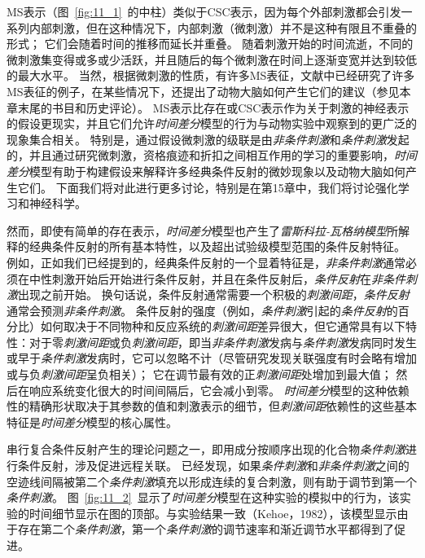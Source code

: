 {MS表示（图~\ref{fig:11_1}~的中柱）类似于CSC表示，因为每个外部刺激都会引发一系列内部刺激，但在这种情况下，内部刺激（微刺激）并不是这种有限且不重叠的形式；
它们会随着时间的推移而延长并重叠。
随着刺激开始的时间流逝，不同的微刺激集变得或多或少活跃，并且随后的每个微刺激在时间上逐渐变宽并达到较低的最大水平。
当然，根据微刺激的性质，有许多MS表征，文献中已经研究了许多MS表征的例子，在某些情况下，还提出了动物大脑如何产生它们的建议（参见本章末尾的书目和历史评论）。
MS表示比存在或CSC表示作为关于刺激的神经表示的假设更现实，并且它们允许\textit{时间差分}模型的行为与动物实验中观察到的更广泛的现象集合相关。
特别是，通过假设微刺激的级联是由\textit{非条件刺激}和\textit{条件刺激}发起的，并且通过研究微刺激，资格痕迹和折扣之间相互作用的学习的重要影响，\textit{时间差分}模型有助于构建假设来解释许多经典条件反射的微妙现象以及动物大脑如何产生它们。
下面我们将对此进行更多讨论，特别是在第15章中，我们将讨论强化学习和神经科学。


然而，即使有简单的存在表示，\textit{时间差分}模型也产生了\textit{雷斯科拉-瓦格纳模型}所解释的经典条件反射的所有基本特性，以及超出试验级模型范围的条件反射特征。
例如，正如我们已经提到的，经典条件反射的一个显着特征是，\textit{非条件刺激}通常必须在中性刺激开始后开始进行条件反射，并且在条件反射后，\textit{条件反射}在\textit{非条件刺激}出现之前开始。
换句话说，条件反射通常需要一个积极的\textit{刺激间距}，\textit{条件反射}通常会预测\textit{非条件刺激}。
条件反射的强度（例如，\textit{条件刺激}引起的\textit{条件反射}的百分比）如何取决于不同物种和反应系统的\textit{刺激间距}差异很大，但它通常具有以下特性：对于零\textit{刺激间距}或负\textit{刺激间距}，即当\textit{非条件刺激}发病与\textit{条件刺激}发病同时发生或早于\textit{条件刺激}发病时，它可以忽略不计（尽管研究发现关联强度有时会略有增加或与负\textit{刺激间距}呈负相关）；
它在调节最有效的正\textit{刺激间距}处增加到最大值；
然后在响应系统变化很大的时间间隔后，它会减小到零。
\textit{时间差分}模型的这种依赖性的精确形状取决于其参数的值和刺激表示的细节，但\textit{刺激间距}依赖性的这些基本特征是\textit{时间差分}模型的核心属性。


串行复合条件反射产生的理论问题之一，即用成分按顺序出现的化合物\textit{条件刺激}进行条件反射，涉及促进远程关联。
已经发现，如果\textit{条件刺激}和\textit{非条件刺激}之间的空迹线间隔被第二个\textit{条件刺激}填充以形成连续的复合刺激，则有助于调节到第一个\textit{条件刺激}。
图~\ref{fig:11_2}~显示了\textit{时间差分}模型在这种实验的模拟中的行为，该实验的时间细节显示在图的顶部。与实验结果一致（Kehoe，1982），该模型显示由于存在第二个\textit{条件刺激}，第一个\textit{条件刺激}的调节速率和渐近调节水平都得到了促进。

}
